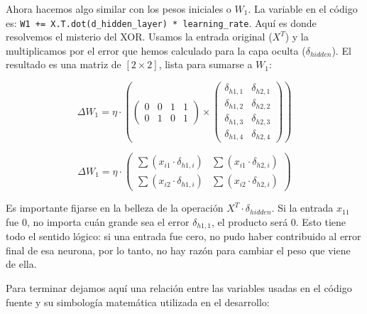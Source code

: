 \documentclass[a4paper,11pt]{article}
\renewenvironment{equation}{\begin{equation*}}{\end{equation*}}
\let\oldequation\equation
\let\endoldequation\endequation
\renewenvironment{equation}
  {\vspace{0.5em}\oldequation}
  {\endoldequation\vspace{0.5em}}
\begin{document}
Ahora hacemos algo similar con los pesos iniciales o \(W_1\). La
variable en el código es:
\texttt{W1\ +=\ X.T.dot(d\_hidden\_layer)\ *\ learning\_rate}. Aquí es
donde resolvemos el misterio del XOR. Usamos la entrada original
(\(X^T\)) y la multiplicamos por el error que hemos calculado para la
capa oculta (\(\delta_{hidden}\)). El resultado es una matriz de
\([2 \times 2]\), lista para sumarse a \(W_1\):

\begin{equation}\Delta W_1 = \eta \cdot \left( \begin{pmatrix} 0 & 0 & 1
& 1 \\ 0 & 1 & 0 & 1 \end{pmatrix} \times \begin{pmatrix} \delta_{h1,1} &
\delta_{h2,1} \\ \delta_{h1,2} & \delta_{h2,2} \\ \delta_{h1,3} & \delta_{h2,3}
\\ \delta_{h1,4} & \delta_{h2,4} \end{pmatrix} \right)\end{equation}

\begin{equation}\Delta W_1 = \eta \cdot
\begin{pmatrix} \sum (x_{i1} \cdot \delta_{h1,i}) & \sum (x_{i1} \cdot
\delta_{h2,i}) \\ \sum (x_{i2} \cdot \delta_{h1,i}) & \sum (x_{i2} \cdot
\delta_{h2,i}) \end{pmatrix}\end{equation}

Es importante fijarse en la belleza de la operación \(X^T \cdot
\delta_{hidden}\). Si la entrada \(x_{11}\) fue 0, no importa cuán grande sea el
error \(\delta_{h1,1}\), el producto será 0.  Esto tiene todo el sentido lógico:
si una entrada fue cero, no pudo haber contribuido al error final de esa
neurona, por lo tanto, no hay razón para cambiar el peso que viene de ella. 


Para terminar dejamos aquí una relación entre las variables usadas en el código
fuente y su simbología matemática utilizada en el desarrollo:
\end{document}
